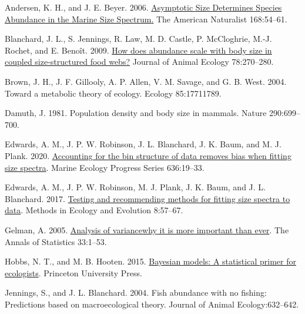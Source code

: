 \documentclass[
  12pt,
]{article}
\newlength{\cslhangindent}
\newlength{\cslentryspacingunit} %
\newenvironment{CSLReferences}[2] %
 {%
  \setlength{\parindent}{0pt}
  \ifodd #1
  \let\oldpar\par
  \def\par{\hangindent=\cslhangindent\oldpar}
  \fi
  \setlength{\parskip}{#2\cslentryspacingunit}
 }%
 {}
\numberwithin{equation}
\begin{document}
\hypertarget{refs}{}
\begin{CSLReferences}{1}{0}
\leavevmode{}%
Andersen, K. H., and J. E. Beyer. 2006.
\href{https://doi.org/10.1086/504849}{Asymptotic {Size Determines
Species Abundance} in the {Marine Size Spectrum}.} The American
Naturalist 168:54--61.

\leavevmode{}%
Blanchard, J. L., S. Jennings, R. Law, M. D. Castle, P. McCloghrie,
M.-J. Rochet, and E. Benoît. 2009.
\href{https://doi.org/10.1111/j.1365-2656.2008.01466.x}{How does
abundance scale with body size in coupled size-structured food webs?}
Journal of Animal Ecology 78:270--280.

\leavevmode{}%
Brown, J. H., J. F. Gillooly, A. P. Allen, V. M. Savage, and G. B. West.
2004. Toward a metabolic theory of ecology. Ecology 85:17711789.

\leavevmode{}%
Damuth, J. 1981. Population density and body size in mammals. Nature
290:699--700.

\leavevmode{}%
Edwards, A. M., J. P. W. Robinson, J. L. Blanchard, J. K. Baum, and M.
J. Plank. 2020. \href{https://doi.org/10.3354/meps13230}{Accounting for
the bin structure of data removes bias when fitting size spectra}.
Marine Ecology Progress Series 636:19--33.

\leavevmode{}%
Edwards, A. M., J. P. W. Robinson, M. J. Plank, J. K. Baum, and J. L.
Blanchard. 2017. \href{https://doi.org/10.1111/2041-210X.12641}{Testing
and recommending methods for fitting size spectra to data}. Methods in
Ecology and Evolution 8:57--67.

\leavevmode{}%
Gelman, A. 2005.
\href{https://doi.org/10.1214/009053604000001048}{Analysis of
variance\textemdash why it is more important than ever}. The Annals of
Statistics 33:1--53.

\leavevmode{}%
Hobbs, N. T., and M. B. Hooten. 2015.
\href{https://doi.org/10.23943/princeton/9780691159287.001.0001}{Bayesian
models: {A} statistical primer for ecologists}. {Princeton University
Press}.

\leavevmode{}%
Jennings, S., and J. L. Blanchard. 2004. Fish abundance with no fishing:
Predictions based on macroecological theory. Journal of Animal
Ecology:632--642.


\end{CSLReferences}
\end{document}
